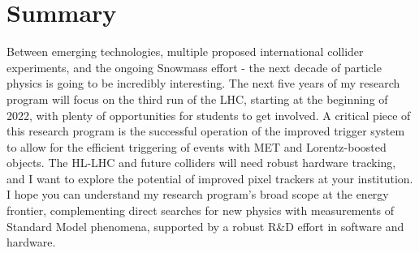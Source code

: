 \documentclass[10pt,a4paper,sans]{moderncv} %
\begin{document}
\section{Summary}
Between emerging technologies, multiple proposed international collider experiments, and the ongoing Snowmass effort - the next decade of particle physics is going to be incredibly interesting. The next five years of my research program will focus on the third run of the LHC, starting at the beginning of 2022, with plenty of opportunities for students to get involved. A critical piece of this research program is the successful operation of the improved trigger system to allow for the efficient triggering of events with MET and Lorentz-boosted objects. The HL-LHC and future colliders will need robust hardware tracking, and I want to explore the potential of improved pixel trackers at your institution.  I hope you can understand my research program's broad scope at the energy frontier, complementing direct searches for new physics with measurements of Standard Model phenomena, supported by a robust R\&D effort in software and hardware.

\printbibliography
\end{document}
